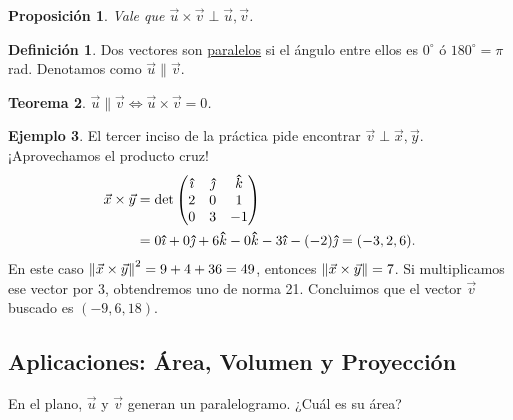 \documentclass[12pt]{article}
\theoremstyle{plain}
\newtheorem{Th}{Teorema}  %
\newtheorem{Prop}[Th]{Proposición}     %
\theoremstyle{definition}
\newtheorem*{Def}{Definición}       %
\newtheorem{Ex}[Th]{Ejemplo}           %
\theoremstyle{remark}
\newcommand{\x}{\times}             %
\renewcommand{\:}{\colon}           %
\newcommand{\un}[1]{\underline{#1}}
\renewcommand{\.}{\Cdot}                %
\newcommand{\threebythree}[9]{\begin{pmatrix} %
  #1 & #2 & #3 \\ #4 & #5 & #6 \\ #7 & #8 & #9 \end{pmatrix}}
\newcommand{\thickhat}[1]{\mathbf{\hat{\text{$#1$}}}}
\newcommand{\ii}{\vu{\imath}}
\newcommand{\jj}{\vu{\jmath}}
\newcommand{\kk}{\thickhat{k}}
\begin{document}
\begin{multicols}{2}
\begin{Prop}
  Vale que $\vec{u}\x\vec{v}\perp\vec{u},\vec{v}$.
\end{Prop}

\begin{Def}
  Dos vectores son \un{paralelos} si el ángulo entre ellos es $0^\circ$ ó $180^\circ=\pi$ rad. Denotamos como $\vec{u}\parallel\vec v$.
\end{Def}

\begin{Th}
  $\vec{u}\parallel\vec v\iff \vec{u}\x \vec v=0$.
\end{Th}

\begin{Ex}
  El tercer inciso de la práctica pide encontrar $\vec v\perp\vec x,\vec y$. ¡Aprovechamos el producto cruz!
  \begin{align*}
    \vec x\x\vec y&=\det\threebythree{\ii}{\jj}{\kk}{2}{0}{1}{0}{3}{-1}\\
    &=0\ii+0\jj+6\kk-0\kk-3\ii-(-2)\jj=(-3,2,6).
  \end{align*}
  En este caso $\norm{\vec x\x\vec y}^2=9+4+36=49$, entonces $\norm{\vec x\x\vec y}=7$. Si multiplicamos ese vector por 3, obtendremos uno de norma 21. Concluimos que el vector $\vec v$ buscado es $(-9,6,18)$.
\end{Ex}

\subsection*{Aplicaciones: Área, Volumen y Proyección}

En el plano, $\vec{u}$ y $\vec{v}$ generan un paralelogramo. ¿Cuál es su área?\par
\vspace{-1em}
\begin{multicols}{2}
 \begin{center}

    \begin{tikzpicture}[x=0.75pt,y=0.75pt,yscale=-1,xscale=1]
    

\end{tikzpicture}
\end{center}
\end{multicols}
\end{multicols}
\end{document}
